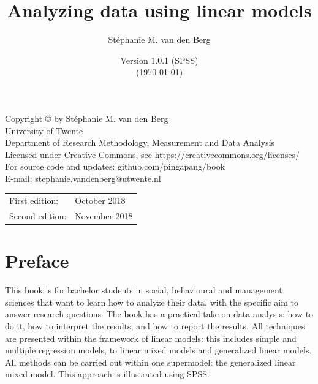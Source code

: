 \documentclass[]{book}\usepackage[]{graphicx}\usepackage[]{color}
\title{Analyzing data using linear models}
\author{St\'ephanie M. van den Berg}
\date{Version 1.0.1 (SPSS)\\ (\today)}
\begin{document}
\frontmatter

\maketitle

\pagestyle{empty}
\begingroup
\footnotesize
\parindent 0pt
\parskip \baselineskip


Copyright \copyright {} by St\'ephanie M. van den Berg \\
University of Twente\\
Department of Research Methodology, Measurement and Data Analysis\\
Licensed under Creative Commons, see https://creativecommons.org/licenses/\\
For source code and updates: github.com/pingapang/book\\
E-mail: stephanie.vandenberg@utwente.nl\\
\ccbyncsa

   

 

\begin{center}
\begin{tabular}{ll}
First edition:  & October 2018 \\
Second edition:  & November 2018 \\
\end{tabular}
\end{center}




\endgroup
\clearpage












\chapter*{Preface}
This book is for bachelor students in social, behavioural and management sciences that want to learn how to analyze their data, with the specific aim to answer research questions. The book has a practical take on data analysis: how to do it, how to interpret the results, and how to report the results. All techniques are presented within the framework of linear models: this includes simple and multiple regression models, to linear mixed models and generalized linear models. All methods can be carried out within one supermodel: the generalized linear mixed model. This approach is illustrated using SPSS.
\end{document}
